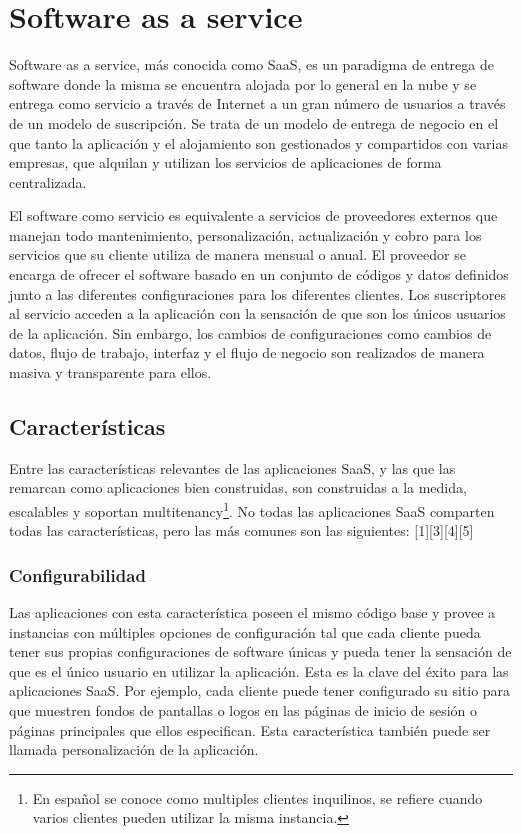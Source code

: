 \section{Software as a service}
Software as a service, más conocida como SaaS, es un paradigma de entrega de software donde la misma se encuentra alojada por lo general en la nube y se entrega como servicio a través de Internet a un gran número de usuarios a través de un modelo de suscripción. Se trata de un modelo de entrega de negocio en el que tanto la aplicación y el alojamiento son gestionados y compartidos con varias empresas, que alquilan y utilizan los servicios de aplicaciones de forma centralizada\citep{gupta_software_2014}.

El software como servicio es equivalente a servicios de proveedores externos que manejan todo mantenimiento, personalización, actualización y cobro para los servicios que su cliente utiliza de manera mensual o anual. El proveedor se encarga de ofrecer el software basado en un conjunto de códigos y datos definidos junto a las diferentes configuraciones para los diferentes clientes. Los suscriptores al servicio acceden a la aplicación con la sensación de que son los únicos usuarios de la aplicación. Sin embargo, los cambios de configuraciones como cambios de datos, flujo de trabajo, interfaz y el flujo de negocio son realizados de manera masiva y transparente para ellos\citep{kumar_cloud_2012}\citep{kang_web_2012}.

\subsection{Características}
Entre las características relevantes de las aplicaciones SaaS, y las que las remarcan como aplicaciones bien construidas, son construidas a la medida, escalables y soportan multitenancy\footnote{En español se conoce como multiples clientes inquilinos, se refiere cuando varios clientes pueden utilizar la misma instancia.}. No todas las aplicaciones SaaS comparten todas las características, pero las más comunes son las siguientes: [1][3][4][5]

\subsubsection{Configurabilidad}
Las aplicaciones con esta característica poseen el mismo código base y provee a instancias con múltiples opciones de configuración tal que cada cliente pueda tener sus propias configuraciones de software únicas y pueda tener la sensación de que es el único usuario en utilizar la aplicación. Esta es la clave del éxito para las aplicaciones SaaS. Por ejemplo, cada cliente puede tener configurado su sitio para que muestren fondos de pantallas o logos en las páginas de inicio de sesión o páginas principales que ellos especifican. Esta característica también puede ser llamada personalización de la aplicación.

